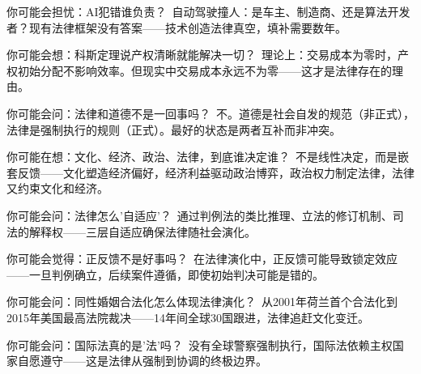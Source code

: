 \documentclass[a4paper,12pt]{book}
\begin{document}
	\begin{tcolorbox}[colback=yellow!5, title=\textit{读者行为预测}]
		你可能会担忧：AI犯错谁负责？\ 自动驾驶撞人：是车主、制造商、还是算法开发者？现有法律框架没有答案——技术创造法律真空，填补需要数年。
	\end{tcolorbox}


	\begin{tcolorbox}[colback=yellow!5, title=\textit{读者行为预测}]
		你可能会想：科斯定理说产权清晰就能解决一切？\ 理论上：交易成本为零时，产权初始分配不影响效率。但现实中交易成本永远不为零——这才是法律存在的理由。
	\end{tcolorbox}


	\begin{tcolorbox}[colback=yellow!5, title=\textit{读者行为预测}]
		你可能会问：法律和道德不是一回事吗？\ 不。道德是社会自发的规范（非正式），法律是强制执行的规则（正式）。最好的状态是两者互补而非冲突。
	\end{tcolorbox}


	\begin{tcolorbox}[colback=yellow!5, title=\textit{读者行为预测}]
		你可能在想：文化、经济、政治、法律，到底谁决定谁？\ 不是线性决定，而是嵌套反馈——文化塑造经济偏好，经济利益驱动政治博弈，政治权力制定法律，法律又约束文化和经济。
	\end{tcolorbox}


	\begin{tcolorbox}[colback=yellow!5, title=\textit{读者行为预测}]
		你可能会问：法律怎么'自适应'？\ 通过判例法的类比推理、立法的修订机制、司法的解释权——三层自适应确保法律随社会演化。
	\end{tcolorbox}


	\begin{tcolorbox}[colback=yellow!5, title=\textit{读者行为预测}]
		你可能会觉得：正反馈不是好事吗？\ 在法律演化中，正反馈可能导致锁定效应——一旦判例确立，后续案件遵循，即使初始判决可能是错的。
	\end{tcolorbox}


	\begin{tcolorbox}[colback=yellow!5, title=\textit{读者行为预测}]
		你可能会问：同性婚姻合法化怎么体现法律演化？\ 从2001年荷兰首个合法化到2015年美国最高法院裁决——14年间全球30国跟进，法律追赶文化变迁。
	\end{tcolorbox}


	\begin{tcolorbox}[colback=yellow!5, title=\textit{读者行为预测}]
		你可能会问：国际法真的是'法'吗？\ 没有全球警察强制执行，国际法依赖主权国家自愿遵守——这是法律从强制到协调的终极边界。
	\end{tcolorbox}
\end{document}
